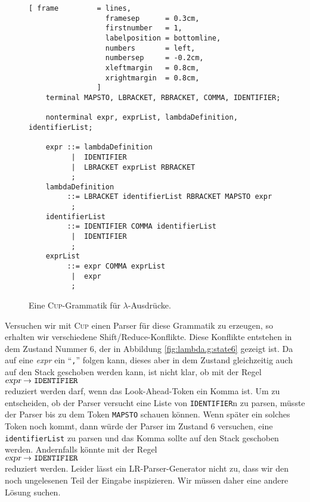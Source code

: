 \begin{figure}[!ht]
\centering
\begin{Verbatim}[ frame         = lines, 
                  framesep      = 0.3cm, 
                  firstnumber   = 1,
                  labelposition = bottomline,
                  numbers       = left,
                  numbersep     = -0.2cm,
                  xleftmargin   = 0.8cm,
                  xrightmargin  = 0.8cm,
                ]
    terminal MAPSTO, LBRACKET, RBRACKET, COMMA, IDENTIFIER;
    
    nonterminal expr, exprList, lambdaDefinition, identifierList;
    
    expr ::= lambdaDefinition
          |  IDENTIFIER  
          |  LBRACKET exprList RBRACKET
          ;   
    lambdaDefinition
         ::= LBRACKET identifierList RBRACKET MAPSTO expr
          ;
    identifierList
         ::= IDENTIFIER COMMA identifierList 
          |  IDENTIFIER
          ;
    exprList
         ::= expr COMMA exprList
          |  expr
          ;
\end{Verbatim}
\vspace*{-0.3cm}
\caption{Eine \textsc{Cup}-Grammatik f\"ur $\lambda$-Ausdr\"ucke.}
\label{fig:lambda.g}
\end{figure}

Versuchen wir mit \textsc{Cup} einen Parser f\"ur diese Grammatik zu erzeugen, so erhalten wir
verschiedene Shift/Reduce-Konflikte.  Diese Konflikte entstehen in dem Zustand Nummer 6, der in
Abbildung \ref{fig:lambda.g:state6} gezeigt ist.  Da auf eine \textsl{expr} ein ``\texttt{,}''
folgen kann, dieses aber in dem Zustand gleichzeitig auch auf den Stack geschoben werden kann, ist
nicht klar, ob mit der Regel 
\\[0.2cm]
\hspace*{1.3cm}
$\textsl{expr} \rightarrow \mathtt{IDENTIFIER}$
\\[0.2cm]
reduziert werden darf, wenn das Look-Ahead-Token ein Komma ist.  Um zu entscheiden, ob der Parser
versucht eine Liste von \texttt{IDENTIFIER}n zu parsen, m\"usste der Parser bis zu dem Token
\texttt{MAPSTO} schauen k\"onnen.  Wenn sp\"ater ein solches Token noch kommt, dann w\"urde der Parser im
Zustand 6 versuchen, eine \texttt{identifierList} zu parsen und das Komma sollte auf den Stack
geschoben werden.  Andernfalls k\"onnte mit der Regel 
\\[0.2cm]
\hspace*{1.3cm}
$\textsl{expr} \rightarrow \mathtt{IDENTIFIER}$
\\[0.2cm]
reduziert werden. Leider l\"asst ein LR-Parser-Generator nicht zu, dass wir den noch ungelesenen Teil
der Eingabe inspizieren.  Wir m\"ussen daher eine andere L\"osung suchen.

